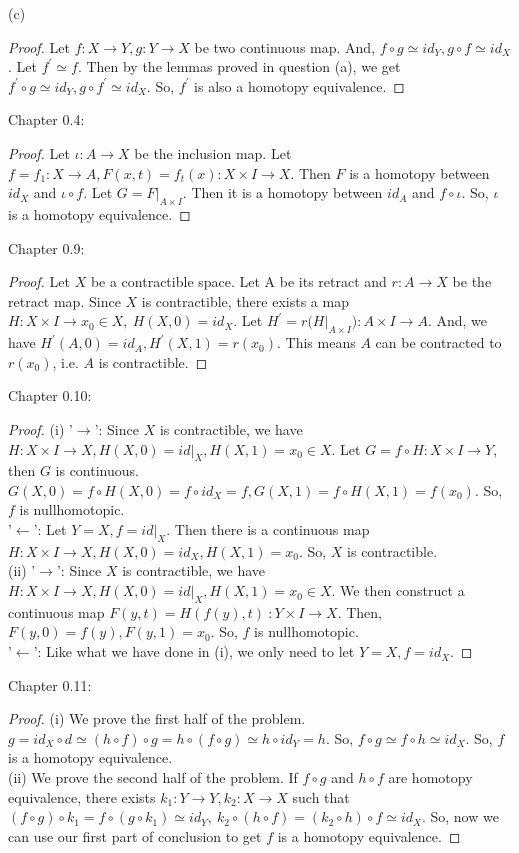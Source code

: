 \documentclass[]{book}
\theoremstyle{definition}
\begin{document}
(c)
\begin{proof}
    Let $f: X\to Y, g:Y\to X$ be two continuous map. And, $f\circ g \simeq id_Y, g\circ f\simeq id_X$. Let $f^{'} \simeq f$. Then by the lemmas proved in question (a), we get $f^{'} \circ g\simeq id_Y, g\circ f^{'}\simeq id_X$. So, $f^{'}$ is also a homotopy equivalence.
\end{proof}

Chapter 0.4: \\
\begin{proof}
    Let $\iota : A \to X$ be the inclusion map. Let $f= f_1:X\to A , F(x,t)=f_t(x): X\times I \to X$. Then $F$ is a homotopy between $id_X$ and $\iota \circ f$. Let $G= F|_{A\times I}$. Then it is a homotopy between $id_A$ and $f\circ \iota$. So, $\iota$ is a homotopy equivalence.
\end{proof}

Chapter 0.9:\\
\begin{proof}
    Let $X$ be a contractible space. Let A be its retract and $r : A\to X$ be the retract map. Since $X$ is contractible, there exists a map $H: X\times I \to x_0\in X, \ H(X,0)=id_X$. Let $H^{'}= r\big( H|_{A\times I}\big) : A\times I\to A$. And, we have $H^{'}(A,0)=id_A, H^{'}(X,1)=r(x_0)$. This means $A$ can be contracted to $r(x_0)$, i.e. $A$ is contractible.
\end{proof}

Chapter 0.10: \begin{proof}
    (i) '$\longrightarrow$': Since $X$ is contractible, we have $H: X\times I \to X, H(X,0)=id|_X, H(X,1)=x_0\in X$. Let $G=f\circ H: X\times I \to Y$, then $G$ is continuous. $G(X,0)= f\circ H(X,0)= f\circ id_X=f, G(X,1)=f\circ H(X,1)= f(x_0)$. So, $f$ is nullhomotopic.\\
    '$\longleftarrow$': Let $Y=X, f=id|_X$. Then there is a continuous map $H: X\times I \to X, H(X,0)=id_X, H(X,1)=x_0$. So, $X$ is contractible.\\
    (ii) '$\longrightarrow$': Since $X$ is contractible, we have $H: X\times I \to X, H(X,0)=id|_X, H(X,1)=x_0\in X$. We then construct a continuous map $F(y,t)=H(f(y),t)\ : Y\times I \to X$. Then, $F(y,0)=f(y), F(y,1)=x_0$. So, $f$ is nullhomotopic.\\
    '$\longleftarrow$': Like what we have done in (i), we only need to let $Y=X, f=id_X$.
\end{proof}

Chapter 0.11: \begin{proof}
(i) We prove the first half of the problem. $g=id_X\circ d \simeq (h\circ f) \circ g= h \circ (f\circ g) \simeq h \circ id_Y = h$. So, $f\circ g \simeq f \circ h\simeq id_X$. So, $f$ is a homotopy equivalence. \\
(ii) We prove the second half of the problem. If $f\circ g$ and $h\circ f$ are homotopy equivalence, there exists $k_1:Y\to Y,k_2:X\to X$ such that $(f\circ g) \circ k_1 =f\circ (g\circ k_1)\simeq id_Y,\ k_2\circ (h\circ f)=(k_2\circ h) \circ f\simeq id_X$. So, now we can use our first part of conclusion to get $f$ is a homotopy equivalence.
\end{proof}
\end{document}
